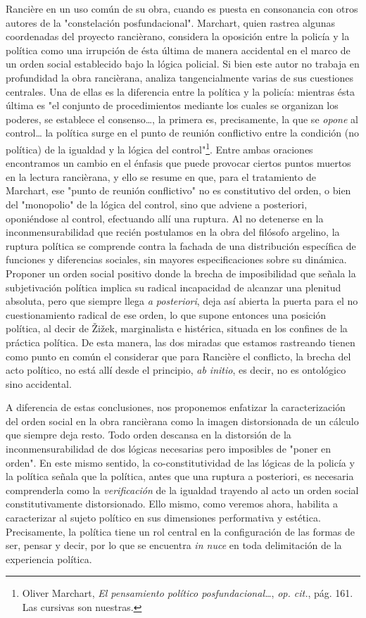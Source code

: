 Rancière en un uso común de su obra, cuando es puesta en consonancia con
otros autores de la "constelación posfundacional". Marchart, quien
rastrea algunas coordenadas del proyecto rancièrano, considera la
oposición entre la policía y la política como una irrupción de ésta
última de manera accidental en el marco de un orden social establecido
bajo la lógica policial. Si bien este autor no trabaja en profundidad la
obra rancièrana, analiza tangencialmente varias de sus cuestiones
centrales. Una de ellas es la diferencia entre la política y la policía:
mientras ésta última es "el conjunto de procedimientos mediante los
cuales se organizan los poderes, se establece el consenso\ldots, la
primera es, precisamente, la que se \emph{opone} al control\ldots{} la
política surge en el punto de reunión conflictivo entre la condición (no
política) de la igualdad y la lógica del control"\footnote{Oliver
  Marchart, \emph{El pensamiento político posfundacional\ldots{}},
  \emph{op. cit.}, pág. 161. Las cursivas son nuestras.}. Entre ambas
oraciones encontramos un cambio en el énfasis que puede provocar ciertos
puntos muertos en la lectura rancièrana, y ello se resume en que, para
el tratamiento de Marchart, ese "punto de reunión conflictivo" no es
constitutivo del orden, o bien del "monopolio" de la lógica del control,
sino que adviene a posteriori, oponiéndose al control, efectuando allí
una ruptura. Al no detenerse en la inconmensurabilidad que recién
postulamos en la obra del filósofo argelino, la ruptura política se
comprende contra la fachada de una distribución específica de funciones
y diferencias sociales, sin mayores especificaciones sobre su dinámica.
Proponer un orden social positivo donde la brecha de imposibilidad que
señala la subjetivación política implica su radical incapacidad de
alcanzar una plenitud absoluta, pero que siempre llega \emph{a
posteriori}, deja así abierta la puerta para el no cuestionamiento
radical de ese orden, lo que supone entonces una posición política, al
decir de Žižek, marginalista e histérica, situada en los confines de la
práctica política. De esta manera, las dos miradas que estamos
rastreando tienen como punto en común el considerar que para Rancière el
conflicto, la brecha del acto político, no está allí desde el principio,
\emph{ab initio}, es decir, no es ontológico sino accidental.

A diferencia de estas conclusiones, nos proponemos enfatizar la
caracterización del orden social en la obra rancièrana como la imagen
distorsionada de un cálculo que siempre deja resto. Todo orden descansa
en la distorsión de la inconmensurabilidad de dos lógicas necesarias
pero imposibles de "poner en orden". En este mismo sentido, la
co-constitutividad de las lógicas de la policía y la política señala que
la política, antes que una ruptura a posteriori, es necesaria
comprenderla como la \emph{verificación} de la igualdad trayendo al acto
un orden social constitutivamente distorsionado. Ello mismo, como
veremos ahora, habilita a caracterizar al sujeto político en sus
dimensiones performativa y estética. Precisamente, la política tiene un
rol central en la configuración de las formas de ser, pensar y decir,
por lo que se encuentra \emph{in nuce} en toda delimitación de la
experiencia política.

